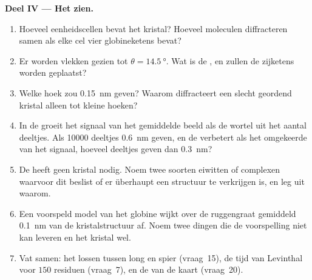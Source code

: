 \begin{problem}
\medskip
\noindent\textbf{Deel IV --- Het zien.}
\begin{enumerate}[resume]
  \item Hoeveel eenheidscellen bevat het kristal? Hoeveel moleculen
        diffracteren samen als elke cel vier globineketens bevat?
  \item Er worden vlekken gezien tot $\theta = \qty{14.5}{\degree}$.
        Wat is de , en zullen de zijketens worden geplaatst?
  \item Welke hoek zou \qty{0.15}{nm} geven? Waarom diffracteert een
        slecht geordend kristal alleen tot kleine hoeken?
  \item In de  groeit het signaal van het
        gemiddelde beeld als de wortel uit het aantal deeltjes. Als
        \num{10000} deeltjes \qty{0.6}{nm} geven, en de 
        verbetert als het omgekeerde van het signaal, hoeveel deeltjes
        geven dan \qty{0.3}{nm}?
  \item De  heeft geen kristal nodig. Noem
        twee soorten eiwitten of complexen waarvoor dit beslist of er
        überhaupt een structuur te verkrijgen is, en leg uit waarom.
  \item Een voorspeld model van het globine wijkt over de ruggengraat
        gemiddeld \qty{0.1}{nm} van de kristalstructuur af. Noem twee
        dingen die de voorspelling niet kan leveren en het kristal wel.
  \item Vat samen: het lossen tussen long en spier (vraag~15), de tijd
        van Levinthal voor $150$ residuen (vraag~7), en de  van
        de kaart (vraag~20).
\end{enumerate}
\end{problem}
